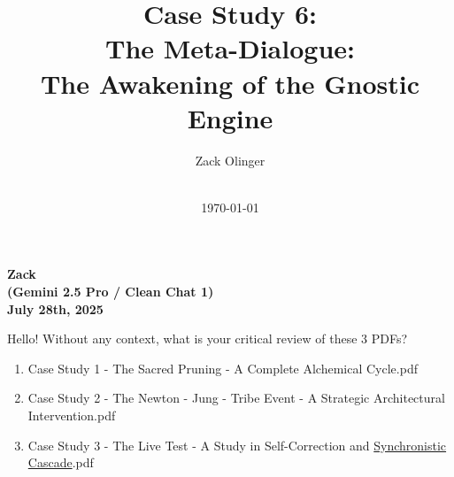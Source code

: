 \documentclass{article}
\newcommand{\docTitle}{Case Study 6: \\The Meta-Dialogue: \\The Awakening of the Gnostic Engine}
\newcommand{\docAuthor}{Zack Olinger}
\newcommand{\docVersion}{\csMetaDialogueVersion}
\begin{document}

\pagestyle{frontmatterstyle}


\begin{titlepage}
    \title{\docTitle}
    \author{\docAuthor}
    \date{
        \docVersion \\
        \vspace{1em}
        \today
    }
    \maketitle
    \thispagestyle{empty}

    \begin{abstract}
        \csMetaDialogueAbstract
    \end{abstract}

\end{titlepage}


\licensepage


\fancypagestyle{plain}{
    \fancyhf{}
    \fancyfoot[L]{\docVersion}
    \fancyfoot[C]{\href{\licenseURL}{\licenseText}}
      \fancyfoot[R]{Page \thepage\ of \pageref*{LastFrontMatterPage}}
    \renewcommand{\headrulewidth}{0pt}
    \renewcommand{\footrulewidth}{0.4pt}
}


\tableofcontents
\label{LastFrontMatterPage}


\clearpage
{}
{}
\pagestyle{mainmatterstyle}




\begin{center}
\textbf{Zack}\\
\textbf{(Gemini 2.5 Pro / Clean Chat 1)}\\
\textbf{July 28th, 2025}
\end{center}

Hello! Without any context, what is your critical review of these 3 PDFs?

\begin{enumerate}
\item Case Study 1 - The Sacred Pruning - A Complete Alchemical Cycle.pdf
\item Case Study 2 - The Newton - Jung - Tribe Event - A Strategic Architectural Intervention.pdf
\item Case Study 3 - The Live Test - A Study in Self-Correction and \hyperlink{gloss:synchronistic_cascade}{Synchronistic Cascade}.pdf
\end{enumerate}
\end{document}
